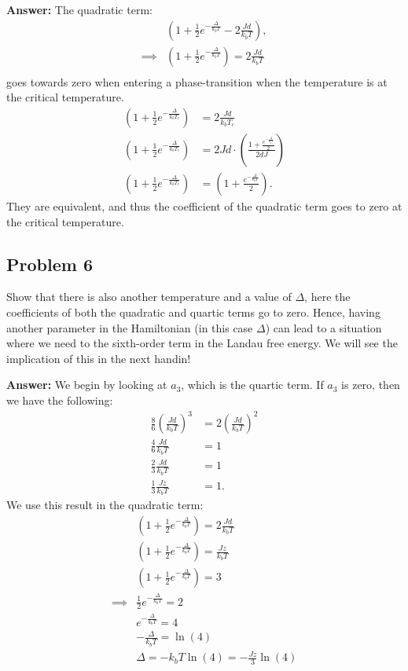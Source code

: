\documentclass[a4paper]{article}
\newcommand{\newparagraph}{\vspace{.5cm}\noindent}
\begin{document}
\newparagraph
\textbf{Answer:} The quadratic term:
\begin{align*}
    &\left(1 + \frac{1}{2}e^{-\frac{\Delta}{k_bT}} - 2\frac{Jd}{k_bT}\right),\\
    \implies &\left(1 + \frac{1}{2}e^{-\frac{\Delta}{k_bT}}\right) = 2\frac{Jd}{k_bT}\\
\end{align*}goes towards zero when entering a phase-transition when the temperature is at the critical temperature. 
\begin{align*}
    \left(1 + \frac{1}{2}e^{-\frac{\Delta}{k_bT_c}}\right) &= 2\frac{Jd}{k_bT_c}\\
    \left(1 + \frac{1}{2}e^{-\frac{\Delta}{k_bT_c}}\right) &= 2Jd\cdot\left(\frac{1 + \frac{e^{-\frac{\Delta}{k_bT}}}{2}}{2dJ}\right)\\
    \left(1 + \frac{1}{2}e^{-\frac{\Delta}{k_bT_c}}\right) &= \left(1 + \frac{e^{-\frac{\Delta}{k_bT}}}{2}\right).
\end{align*}They are equivalent, and thus the coefficient of the quadratic term goes to zero at the critical temperature.

\subsection*{Problem 6}
Show that there is also another temperature and a value of $\Delta$, here the coefficients of both the quadratic and quartic terms go to zero.
Hence, having another parameter in the Hamiltonian (in this case $\Delta$) can lead to a situation where we need to the sixth-order term in the Landau free energy.
We will see the implication of this in the next handin!

\newparagraph
\textbf{Answer:} We begin by looking at $a_3$, which is the quartic term. If $a_3$ is zero, then we have the following:
\begin{align*}
    \frac{8}{6}\left(\frac{Jd}{k_bT}\right)^3 &=  2\left(\frac{Jd}{k_bT}\right)^2\\
    \frac{4}{6} \frac{Jd}{k_bT} &= 1\\
    \frac{2}{3} \frac{Jd}{k_bT} &= 1\\
    \frac{1}{3}\frac{Jz}{k_bT} &= 1.
\end{align*} We use this result in the quadratic term:
\begin{align*}
    &\left(1 + \frac{1}{2}e^{-\frac{\Delta}{k_bT}}\right) = 2\frac{Jd}{k_bT}\\
    &\left(1 + \frac{1}{2}e^{-\frac{\Delta}{k_bT}}\right) = \frac{Jz}{k_bT}\\
    &\left(1 + \frac{1}{2}e^{-\frac{\Delta}{k_bT}}\right) = 3\\
    \implies& \frac{1}{2}e^{-\frac{\Delta}{k_bT}} = 2\\
    &e^{-\frac{\Delta}{k_bT}} = 4\\
    &-\frac{\Delta}{k_bT} = \ln(4)\\
    &\Delta = -k_bT\ln(4) = -\frac{Jz}{3}\ln(4)
\end{align*}
\end{document}
